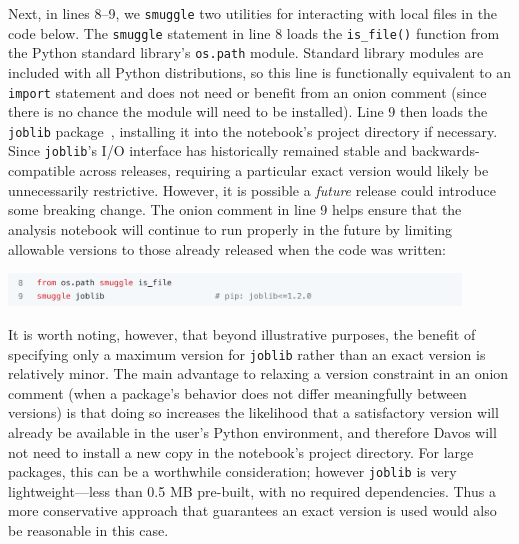 \documentclass[preprint,12pt,a4paper]{elsarticle}
\begin{document}
Next, in lines 8--9, we \texttt{smuggle} two
utilities for interacting with local files in the code below. The
\texttt{smuggle} statement in line 8 loads the \texttt{is\_file()}
function from the Python standard library's \texttt{os.path}
module. Standard library modules are included with all Python
distributions, so this line is functionally equivalent to an
\texttt{import} statement and does not need or benefit from an onion
comment (since there is no chance the module will need to be installed).
Line 9 then loads the \texttt{joblib} package~\cite{Varo10},
installing it into the notebook's project directory if necessary. Since \texttt{joblib}'s I/O
interface has historically remained stable and backwards-compatible
across releases, requiring a particular exact version
would likely be unnecessarily restrictive. However, it is possible a
\textit{future} release could introduce some breaking change.  The
onion comment in line 9 helps ensure that the analysis notebook will continue
to run properly in the future by limiting allowable versions to those
already released when the code was written:
\begin{center}
\includegraphics[width=0.9\textwidth]{figs/example2}
\end{center}
It is worth noting, however, that beyond illustrative purposes, the benefit of specifying only a maximum version for \texttt{joblib} rather than an exact version is relatively minor.
The main advantage to relaxing a version constraint in an onion comment (when a package's behavior does not differ meaningfully between versions) is that doing so increases the likelihood that a satisfactory version will already be available in the user's Python environment, and therefore Davos will not need to install a new copy in the notebook's project directory.
For large packages, this can be a worthwhile consideration; however \texttt{joblib} is very lightweight---less than 0.5 MB pre-built, with no required dependencies.
Thus a more conservative approach that guarantees an exact version is used would also be reasonable in this case.
\end{document}
